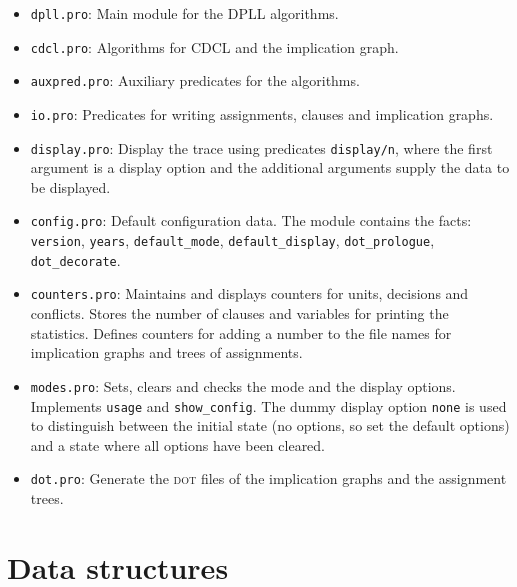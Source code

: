 \documentclass[11pt]{article}
\newcommand*{\p}[1]{\textup{\texttt{#1}}}
\newcommand*{\dt}{\textsc{dot}}
\begin{document}
\begin{itemize}
\item \p{dpll.pro}: Main module for the DPLL algorithms.

\item \p{cdcl.pro}: Algorithms for CDCL and the implication graph.

\item \p{auxpred.pro}: Auxiliary predicates for the algorithms. 

\item \p{io.pro}: Predicates for writing assignments, clauses and
implication graphs.

\item \p{display.pro}: Display the trace using predicates \p{display/n},
where the first argument is a display option and the additional
arguments supply the data to be displayed.

\item \p{config.pro}: Default configuration data. The module contains
the facts: \p{version}, \p{years}, \p{default\_mode},
\p{default\_display}, \p{dot\_prologue}, \p{dot\_decorate}.

\item \p{counters.pro}: Maintains and displays counters for units,
decisions and conflicts. Stores the number of clauses and variables for
printing the statistics. Defines counters for adding a number to the
file names for implication graphs and trees of assignments.

\item \p{modes.pro}: Sets, clears and checks the mode and the display
options. Implements \p{usage} and \p{show\_config}. The dummy
display option \p{none} is used to distinguish between the initial state
(no options, so set the default options) and a state where all options
have been cleared.

\item \p{dot.pro}: Generate the \dt{} files of the implication graphs
and the assignment trees.
\end{itemize}

\section{Data structures}
\end{document}
